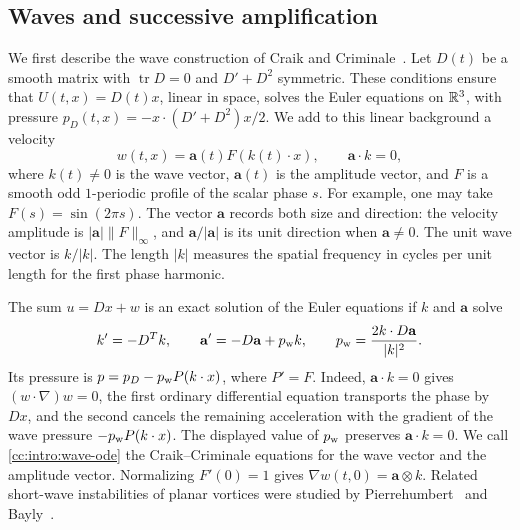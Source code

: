 \subsection{Waves and successive amplification}\label{cc:sec:intro-waves}
We first describe the wave construction of Craik and
Criminale~\cite{CraikCriminale}. Let $D(t)$ be a smooth matrix with
$\operatorname{tr}D=0$ and $D'+D^2$ symmetric. These conditions ensure that
$U(t,x)=D(t)x$, linear in space, solves the Euler equations on $\mathbb R^3$, with pressure
$p_D(t,x)=-x\cdot(D'+D^2)x/2$. We add to this linear background a velocity
\[
 w(t,x)=\mathbf a(t)F(k(t)\cdot x),\qquad \mathbf a\cdot k=0,
\]
where $k(t)\ne0$ is the wave vector, $\mathbf a(t)$ is the amplitude
vector, and $F$ is a smooth odd $1$-periodic profile of the scalar phase $s$.
For example, one may take $F(s)=\sin(2\pi s)$. The vector $\mathbf a$
records both size and direction: the velocity amplitude is $|\mathbf a|\|F\|_\infty$, and
$\mathbf a/|\mathbf a|$ is its unit direction when $\mathbf a\ne0$.
The unit wave vector is $k/|k|$. The length $|k|$ measures the spatial
frequency in cycles per unit length for the first phase harmonic.

The sum $u=Dx+w$ is an exact solution of the Euler equations if $k$ and $\mathbf a$ solve
\begin{equation}\label{cc:intro:wave-ode}
 k'=-D^Tk,\qquad
 \mathbf a'=-D\mathbf a+p_{\rm w} k,\qquad
 p_{\rm w}=\frac{2k\cdot D\mathbf a}{|k|^2}.
\end{equation}
Its pressure is $p=p_D-p_{\rm w} P(k\cdot x)$, where $P'=F$.
Indeed, $\mathbf a\cdot k=0$ gives $(w\cdot\nabla)w=0$, the first
ordinary differential equation transports the phase by $Dx$, and the
second cancels the remaining acceleration with the gradient of the
wave pressure $-p_{\rm w}P(k\cdot x)$.
The displayed value of $p_{\rm w}$ preserves $\mathbf a\cdot k=0$.
We call \eqref{cc:intro:wave-ode} the Craik--Criminale equations for the
wave vector and the amplitude vector. Normalizing $F'(0)=1$ gives
$\nabla w(t,0)=\mathbf a\otimes k$.
Related short-wave instabilities of planar vortices were studied by
Pierrehumbert~\cite{Pierrehumbert1986} and Bayly~\cite{Bayly1986}.

